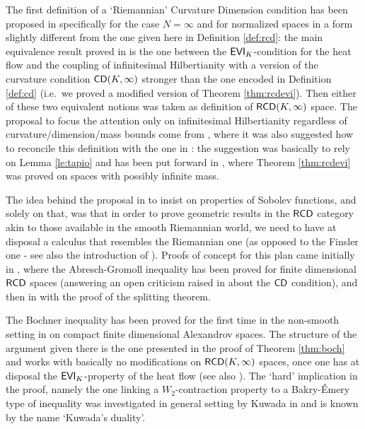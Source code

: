 \documentclass[11pt]{article}
\numberwithin{equation}{section}
\newcommand{\CD}{{\sf CD}}
\newcommand{\RCD}{{\sf RCD}}
\newcommand{\EVI}{{\sf EVI}}
\begin{document}
{{The first definition of a `Riemannian' Curvature Dimension condition has been proposed in \cite{AmbrosioGigliSavare11-2}  specifically for the case $N=\infty$ and for normalized spaces in a form slightly different from the one given here in Definition \ref{def:rcd}: the main equivalence result proved in \cite{AmbrosioGigliSavare11-2}  is the one between the $\EVI_K$-condition for the heat flow and the coupling of infinitesimal Hilbertianity with a version of the curvature condition $\CD(K,\infty)$ stronger than the one encoded in Definition \ref{def:cd} (i.e.\ we proved a modified version of Theorem \ref{thm:rcdevi}). Then either of these two equivalent notions was taken as definition of $\RCD(K,\infty)$ space. The proposal to focus the attention only on infinitesimal Hilbertianity regardless of curvature/dimension/mass bounds come from \cite[Remark 4.20]{Gigli12}, where it was also suggested how to reconcile this definition with the one in \cite{AmbrosioGigliSavare11-2}: the suggestion was basically to rely on Lemma \ref{le:tapio} and has been put forward in \cite{AmbrosioGigliMondinoRajala12}, where Theorem \ref{thm:rcdevi} was proved on spaces with possibly infinite mass.

The idea behind the proposal in  \cite{Gigli12} to insist on properties of Sobolev functions, and solely on that, was that in order to prove geometric results in the $\RCD$ category akin to those available in the smooth Riemannian world, we need to have at disposal a calculus that resembles the Riemannian one (as opposed to the Finsler one - see also the introduction of \cite{Gigli13over}). Proofs of concept for this plan came initially  in \cite{Gigli-Mosconi12}, where the Abresch-Gromoll inequality has been proved for finite dimensional $\RCD$ spaces (answering an open criticism raised in \cite{Petrunin11} about the $\CD$ condition), and then in \cite{Gigli13} with the proof of the splitting theorem.



The Bochner inequality has been proved for the first time in the non-smooth setting in \cite{Gigli-Kuwada-Ohta10} on compact finite dimensional Alexandrov spaces. The structure of the argument given there is the one presented in the proof of Theorem \ref{thm:boch} and works with basically no modifications on $\RCD(K,\infty)$ spaces, once one has at disposal the $\EVI_K$-property of the heat flow (see also  \cite[Remark 6.3]{AmbrosioGigliSavare11-2}). The `hard' implication in the proof, namely the one linking a $W_2$-contraction property to a Bakry-\'Emery type of inequality was investigated in general setting by Kuwada in \cite{Kuwada10} and is known by the name `Kuwada's duality'.


}}
\end{document}
